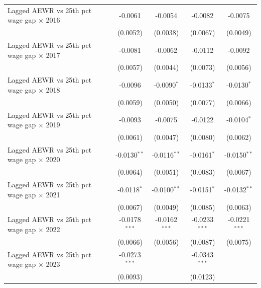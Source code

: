 \begin{tabular}{lcccc}
   Lagged AEWR vs 25th pct wage gap $\times$ 2016  & -0.0061         & -0.0054         & -0.0082                & -0.0075\\   
                                                   & (0.0052)        & (0.0038)        & (0.0067)               & (0.0049)\\   
   Lagged AEWR vs 25th pct wage gap $\times$ 2017  & -0.0081         & -0.0062         & -0.0112                & -0.0092\\   
                                                   & (0.0057)        & (0.0044)        & (0.0073)               & (0.0056)\\   
   Lagged AEWR vs 25th pct wage gap $\times$ 2018  & -0.0096         & -0.0090$^{*}$   & -0.0133$^{*}$          & -0.0130$^{*}$\\   
                                                   & (0.0059)        & (0.0050)        & (0.0077)               & (0.0066)\\   
   Lagged AEWR vs 25th pct wage gap $\times$ 2019  & -0.0093         & -0.0075         & -0.0122                & -0.0104$^{*}$\\   
                                                   & (0.0061)        & (0.0047)        & (0.0080)               & (0.0062)\\   
   Lagged AEWR vs 25th pct wage gap $\times$ 2020  & -0.0130$^{**}$  & -0.0116$^{**}$  & -0.0161$^{*}$          & -0.0150$^{**}$\\   
                                                   & (0.0064)        & (0.0051)        & (0.0083)               & (0.0067)\\   
   Lagged AEWR vs 25th pct wage gap $\times$ 2021  & -0.0118$^{*}$   & -0.0100$^{**}$  & -0.0151$^{*}$          & -0.0132$^{**}$\\   
                                                   & (0.0067)        & (0.0049)        & (0.0085)               & (0.0063)\\   
   Lagged AEWR vs 25th pct wage gap $\times$ 2022  & -0.0178$^{***}$ & -0.0162$^{***}$ & -0.0233$^{***}$        & -0.0221$^{***}$\\   
                                                   & (0.0066)        & (0.0056)        & (0.0087)               & (0.0075)\\   
   Lagged AEWR vs 25th pct wage gap $\times$ 2023  & -0.0273$^{***}$ &                 & -0.0343$^{***}$        &   \\   
                                                   & (0.0093)        &                 & (0.0123)               &   \\   

\end{tabular}
